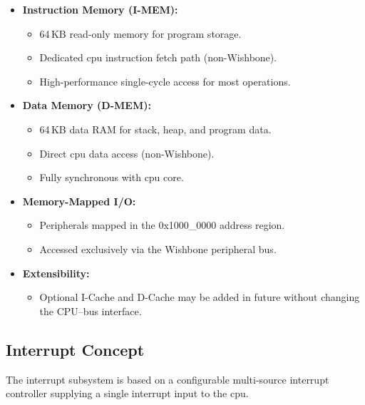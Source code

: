 \begin{itemize}
    \item \textbf{Instruction Memory (\gls{I-MEM}):}
          \begin{itemize}
              \item 64\,KB read-only memory for program storage.
              \item Dedicated \gls{cpu} instruction fetch path (non-Wishbone).
              \item High-performance single-cycle access for most operations.
          \end{itemize}

    \item \textbf{Data Memory (\gls{D-MEM}):}
          \begin{itemize}
              \item 64\,KB data RAM for stack, heap, and program data.
              \item Direct \gls{cpu} data access (non-Wishbone).
              \item Fully synchronous with \gls{cpu} core.
          \end{itemize}

    \item \textbf{Memory-Mapped I/O:}
          \begin{itemize}
              \item Peripherals mapped in the 0x1000\_0000 address region.
              \item Accessed exclusively via the Wishbone peripheral bus.
          \end{itemize}

    \item \textbf{Extensibility:}
          \begin{itemize}
              \item Optional I-Cache and D-Cache may be added in future without changing the CPU–bus interface.
          \end{itemize}
\end{itemize}

\subsection{Interrupt Concept}
The interrupt subsystem is based on a configurable multi-source interrupt controller supplying a single interrupt input to the \gls{cpu}.

